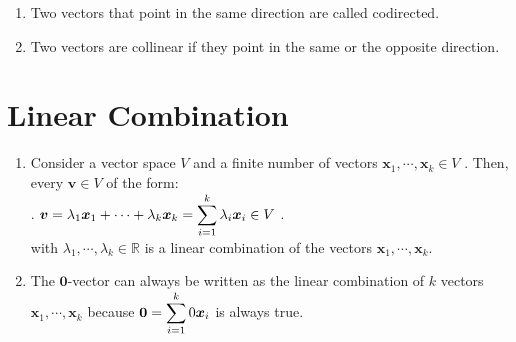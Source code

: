 \begin{enumerate}
    \item 
    \begin{definition}[Codirection]
        Two vectors that point in the same direction are called codirected. 
        \hfill \cite{mfml/book/mml/Deisenroth-Faisal-Ong}
    \end{definition}
    
    \item 
    \begin{definition}[Collinearity]
        Two vectors are collinear if they point in the same or the opposite direction. 
        \hfill \cite{mfml/book/mml/Deisenroth-Faisal-Ong}
    \end{definition}
\end{enumerate}
















\section{Linear Combination}

\begin{enumerate}
    \item 
    \begin{definition}
        Consider a vector space $V$ and a finite number of vectors $\bm{x}_1, \cdots , \bm{x}_k \in V$ . 
        Then, every $\bm{v} \in V$ of the form:
        \\
        .\hfill
        $
            \bm{v} 
            = \lambda _1 \bm{x}_1 + \cdots + \lambda _k \bm{x}_k
            = \displaystyle\sum_{i=1}^k \lambda _i \bm{x}_i
            \in V
        $
        \hfill.
        \\
        with $\lambda _1, \cdots , \lambda _k \in \mathbb{R}$ is a linear combination of the vectors $\bm{x}_1, \cdots , \bm{x}_k$.
        \hfill \cite{mfml/book/mml/Deisenroth-Faisal-Ong}
    \end{definition}

    \item The $\bm{0}$-vector can always be written as the linear combination of $k$ vectors $\bm{x}_1, \cdots , \bm{x}_k$ because $\bm{0} = \displaystyle\sum ^k _{i=1} 0 \bm{x}_i$ is always true.
    \hfill \cite{mfml/book/mml/Deisenroth-Faisal-Ong}

    
\end{enumerate}







